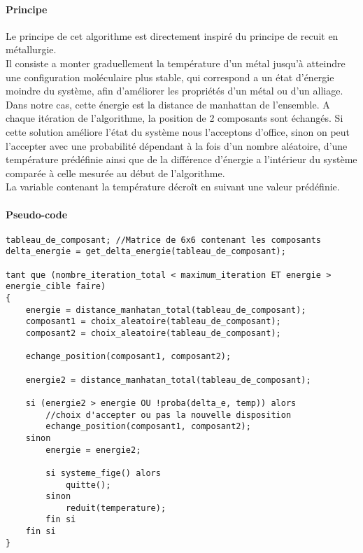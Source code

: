\paragraph{Principe}
Le principe de cet algorithme est directement inspiré du principe de recuit en métallurgie.\\
Il consiste a monter graduellement la température d'un métal jusqu'à atteindre une configuration moléculaire plus stable, qui correspond a un état d'énergie moindre du système, afin d'améliorer les propriétés d'un métal ou d'un alliage.\\
Dans notre cas, cette énergie est la distance de manhattan de l'ensemble.
A chaque itération de l'algorithme, la position de 2 composants sont échangés. Si cette solution améliore l'état du système nous l'acceptons d'office, sinon on peut l'accepter avec une probabilité dépendant à la fois d'un nombre aléatoire, d'une température prédéfinie ainsi que de la différence d'énergie a l'intérieur du système comparée à celle mesurée au début de l'algorithme. \\
La variable contenant la température décroît en suivant une valeur prédéfinie.
\newpage
\paragraph{Pseudo-code}
\noindent
\begin{centering}


\begin{lstlisting}
tableau_de_composant; //Matrice de 6x6 contenant les composants
delta_energie = get_delta_energie(tableau_de_composant);

tant que (nombre_iteration_total < maximum_iteration ET energie > energie_cible faire)
{
	energie = distance_manhatan_total(tableau_de_composant);
	composant1 = choix_aleatoire(tableau_de_composant);
	composant2 = choix_aleatoire(tableau_de_composant);
	
	echange_position(composant1, composant2);
	
	energie2 = distance_manhatan_total(tableau_de_composant);
	
	si (energie2 > energie OU !proba(delta_e, temp)) alors
	    //choix d'accepter ou pas la nouvelle disposition
		echange_position(composant1, composant2);
	sinon
		energie = energie2;
		
		si systeme_fige() alors
		    quitte();
		sinon
		    reduit(temperature);
		fin si
    fin si
}
\end{lstlisting}
\end{centering}
\newpage
